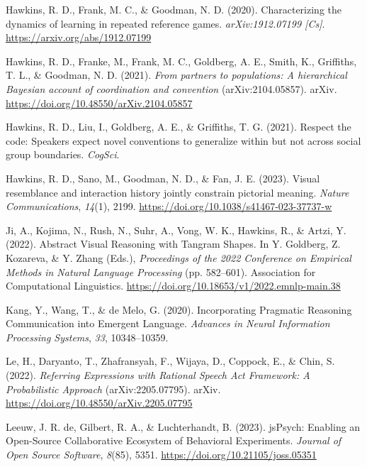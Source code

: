 \documentclass[10pt, letterpaper]{article}
\begin{document}
\begin{CSLReferences}{1}{0}
Hawkins, R. D., Frank, M. C., \& Goodman, N. D. (2020). Characterizing
the dynamics of learning in repeated reference games.
\emph{arXiv:1912.07199 {[}Cs{]}}. \url{https://arxiv.org/abs/1912.07199}

Hawkins, R. D., Franke, M., Frank, M. C., Goldberg, A. E., Smith, K.,
Griffiths, T. L., \& Goodman, N. D. (2021). \emph{From partners to
populations: {A} hierarchical {Bayesian} account of coordination and
convention} (arXiv:2104.05857). arXiv.
\url{https://doi.org/10.48550/arXiv.2104.05857}

Hawkins, R. D., Liu, I., Goldberg, A. E., \& Griffiths, T. G. (2021).
Respect the code: {Speakers} expect novel conventions to generalize
within but not across social group boundaries. \emph{CogSci}.

Hawkins, R. D., Sano, M., Goodman, N. D., \& Fan, J. E. (2023). Visual
resemblance and interaction history jointly constrain pictorial meaning.
\emph{Nature Communications}, \emph{14}(1), 2199.
\url{https://doi.org/10.1038/s41467-023-37737-w}

Ji, A., Kojima, N., Rush, N., Suhr, A., Vong, W. K., Hawkins, R., \&
Artzi, Y. (2022). Abstract {Visual Reasoning} with {Tangram Shapes}. In
Y. Goldberg, Z. Kozareva, \& Y. Zhang (Eds.), \emph{Proceedings of the
2022 {Conference} on {Empirical Methods} in {Natural Language
Processing}} (pp. 582--601). Association for Computational Linguistics.
\url{https://doi.org/10.18653/v1/2022.emnlp-main.38}

Kang, Y., Wang, T., \& de Melo, G. (2020). Incorporating {Pragmatic
Reasoning Communication} into {Emergent Language}. \emph{Advances in
{Neural Information Processing Systems}}, \emph{33}, 10348--10359.

Le, H., Daryanto, T., Zhafransyah, F., Wijaya, D., Coppock, E., \& Chin,
S. (2022). \emph{Referring {Expressions} with {Rational Speech Act
Framework}: {A Probabilistic Approach}} (arXiv:2205.07795). arXiv.
\url{https://doi.org/10.48550/arXiv.2205.07795}

Leeuw, J. R. de, Gilbert, R. A., \& Luchterhandt, B. (2023). {jsPsych}:
{Enabling} an {Open-Source Collaborative Ecosystem} of {Behavioral
Experiments}. \emph{Journal of Open Source Software}, \emph{8}(85),
5351. \url{https://doi.org/10.21105/joss.05351}


\end{CSLReferences}
\end{document}
